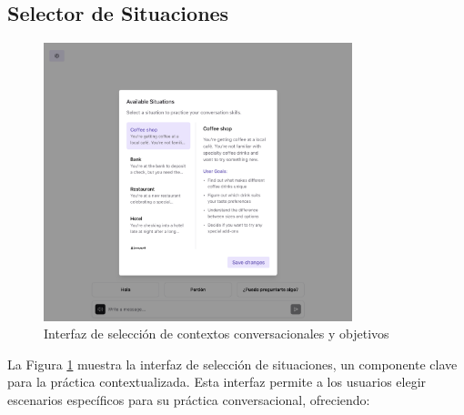 \subsection{Selector de Situaciones}
\label{selector-situaciones}

\begin{figure}[H]
    \centering
    \includegraphics[width=0.8\textwidth]{figuras/screenshots/situation-picker.png}
    \caption{Interfaz de selección de contextos conversacionales y objetivos}
    \label{fig:situation-picker}
\end{figure}

La Figura \ref{fig:situation-picker} muestra la interfaz de selección de situaciones, un componente clave para la práctica contextualizada. Esta interfaz permite a los usuarios elegir escenarios específicos para su práctica conversacional, ofreciendo:

